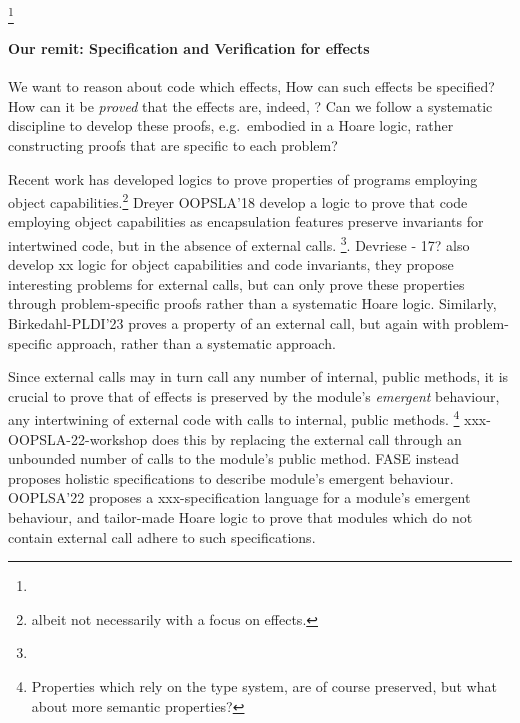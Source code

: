 \footnote{
 }
 
\paragraph{Our remit: Specification and Verification  for  \tamed effects}  
We want to reason about  code which \tames effects,  
How can such \tamed effects be specified? How can  it be \emph{proved} that %
the effects are, indeed, \tamed?
Can we follow a systematic discipline to develop these proofs,
e.g.\ embodied in  a Hoare logic, rather constructing proofs that are 
specific to each problem?
 
Recent work has developed logics to prove properties of programs employing object capabilities.\footnote{albeit not necessarily with a focus on \tamed effects.}
Dreyer OOPSLA'18 develop a logic to prove that   code employing object capabilities as encapsulation features preserve invariants for intertwined code, but in the absence of external calls. 
 \footnote{}.
Devriese - 17? also develop xx logic for object capabilities and code
invariants, they propose interesting problems for external calls,
but can only prove these properties through problem-specific proofs
rather than a systematic Hoare logic. Similarly, 
Birkedahl-PLDI'23  proves a property of an external call, but again with
problem-specific approach, rather than a systematic approach.


Since external calls may in turn call any number of internal, public methods, 
it is crucial  to prove that \taming of effects is preserved by the module's 
\emph{emergent} behaviour, \ie any intertwining of external code with calls to internal, public methods.
\footnote{Properties which rely on the type system, are of course preserved, but what about more semantic properties?}
xxx-OOPSLA-22-workshop does this by replacing the external call through an unbounded number of calls to the module's public method.
 FASE instead proposes holistic specifications to describe   module's emergent behaviour. 
 OOPLSA'22 proposes a xxx-specification language for a module's emergent behaviour, and  tailor-made Hoare logic to prove that modules which do not contain external call adhere to such specifications.



